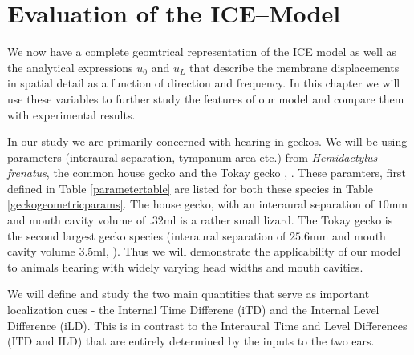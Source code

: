 \chapter{Evaluation of the ICE--Model}\label{modelanalysis}
We now have a complete geomtrical representation of the ICE model as well as
 the analytical expressions $u_0$ and $u_L$ that describe the membrane displacements
in spatial detail as a function of direction and frequency. In this chapter we will use these variables
to further study the features of our model and compare them with experimental results.

In our study we are primarily concerned with hearing in geckos. We will be using
parameters (interaural separation, tympanum area etc.) from \textit{Hemidactylus frenatus}, the common house gecko
\cite{dalsgaardmanley2}
and the Tokay gecko \cite{dalsgaardmanley1}, \cite{dalsgaardtangcarr}. These paramters, first defined in Table \ref{parametertable} are listed for both these
species in Table \ref{geckogeometricparams}. The house gecko, with an interaural separation of $10$mm and mouth cavity volume of $.32$ml is a rather
small lizard. The Tokay gecko is the second largest gecko species (interaural separation of $25.6$mm and mouth cavity volume $3.5$ml, \cite{dalsgaardtangcarr}).
Thus we will demonstrate the applicability of our model to animals hearing with widely varying head widths and mouth cavities. 

We will define and study the two main quantities that serve as important localization
cues - the Internal Time Differene (iTD) and the Internal Level Difference (iLD). This
is in contrast to the Interaural Time and Level Differences (ITD and ILD) that are
entirely determined by the inputs to the two ears.

